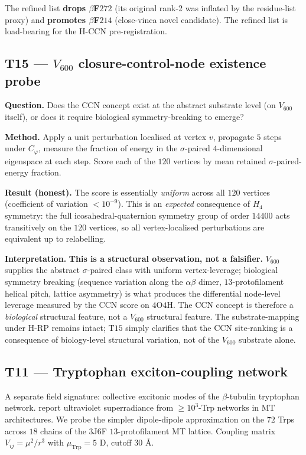 \documentclass[11pt,a4paper]{article}
\begin{document}
The refined list \textbf{drops $\beta$F$272$} (its original rank-2
was inflated by the residue-list proxy) and \textbf{promotes
$\beta$F$214$} (close-vinca novel candidate). The refined list is
load-bearing for the H-CCN pre-registration.

\subsection{\textsf{T15} --- $V_{600}$ closure-control-node existence probe}\label{ssec:t15}

\textbf{Question.} Does the CCN concept exist at the abstract
substrate level (on $V_{600}$ itself), or does it require biological
symmetry-breaking to emerge?

\textbf{Method.} Apply a unit perturbation localised at vertex $v$,
propagate $5$ steps under $C_\varphi$, measure the fraction of energy
in the $\sigma$-paired $4$-dimensional eigenspace at each step. Score
each of the $120$ vertices by mean retained $\sigma$-paired-energy
fraction.

\textbf{Result (honest).} The score is essentially \emph{uniform}
across all $120$ vertices (coefficient of variation $< 10^{-9}$).
This is an \emph{expected} consequence of $H_4$ symmetry: the full
icosahedral-quaternion symmetry group of order $14400$ acts
transitively on the $120$ vertices, so all vertex-localised
perturbations are equivalent up to relabelling.

\textbf{Interpretation.} \textbf{This is a structural observation,
not a falsifier.} $V_{600}$ supplies the abstract $\sigma$-paired
class with uniform vertex-leverage; biological symmetry breaking
(sequence variation along the $\alpha\beta$ dimer, $13$-protofilament
helical pitch, lattice asymmetry) is what produces the differential
node-level leverage measured by the CCN score on $4$O$4$H. The CCN
concept is therefore a \emph{biological} structural feature, not a
$V_{600}$ structural feature. The substrate-mapping under H-RP
remains intact; T$15$ simply clarifies that the CCN site-ranking
is a consequence of biology-level structural variation, not of the
$V_{600}$ substrate alone.

\subsection{\textsf{T11} --- Tryptophan exciton-coupling network}\label{ssec:t11}

A separate field signature: collective excitonic modes of the
$\beta$-tubulin tryptophan network. \citet{Babcock2024} report
ultraviolet superradiance from $\geq\!10^3$-Trp networks in MT
architectures. We probe the simpler dipole-dipole approximation on
the $72$ Trps across $18$ chains of the $3$J$6$F $13$-protofilament
MT lattice. Coupling matrix $V_{ij} = \mu^2 / r^3$ with
$\mu_{\mathrm{Trp}} = 5$ D, cutoff $30$ \AA.
\end{document}
